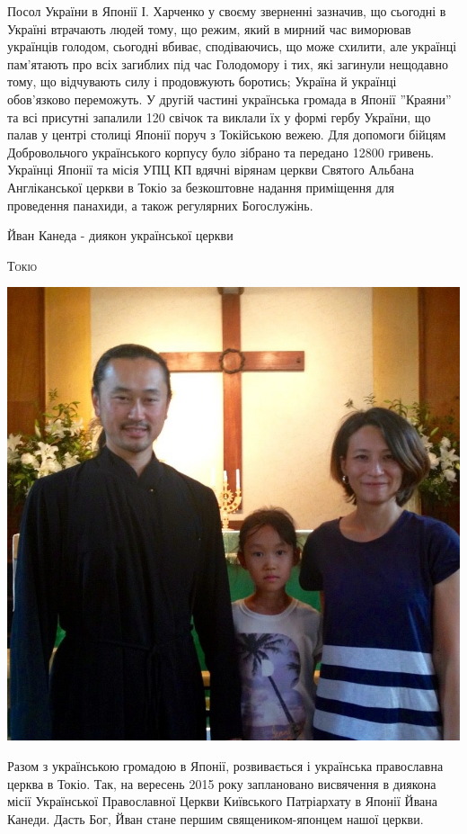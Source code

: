 \documentclass[10pt,a4paper]{article}
\newcommand{\NewsItem}[1]{%
		\usefont{T2A}{iwona}{m}{n} 
		\large #1 \vspace{4pt}
		\par \normalsize \normalfont}
\newcommand{\NewsAuthor}[1]{%
			\hfill \textsc{#1} \vspace{4pt}
			\par \normalfont}
\begin{document}
\begin{multicols}{3}
Посол України в Японії І. Харченко у своєму зверненні зазначив, що сьогодні в Україні втрачають людей тому, що режим, який в мирний час виморював українців голодом, сьогодні вбиває, сподіваючись, що може схилити, але українці пам'ятають про всіх загиблих під час Голодомору і тих, які загинули нещодавно тому, що відчувають силу і продовжують боротись; Україна й українці обов'язково переможуть.
У другій частині українська громада в Японії ''Краяни'' та всі присутні запалили 120 свічок та виклали їх у формі гербу України, що палав у центрі столиці Японії поруч з Токійською вежею.
Для допомоги бійцям Добровольчого українського корпусу було зібрано та передано 12800 гривень.
Українці Японії та місія УПЦ КП вдячні вірянам церкви Святого Альбана Англіканської церкви в Токіо за безкоштовне надання приміщення для проведення панахиди, а також регулярних Богослужінь.

\vspace{1cm}
\NewsItem{Йван Канеда - диякон української церкви}
\NewsAuthor{Токіо}
		\begin{center}
			\includegraphics[width=0.8\linewidth]{images/kaneda}
		\end{center}
Разом з українською громадою в Японії, розвивається і українська православна церква в Токіо. Так, на вересень 2015 року заплановано висвячення в диякона місії Української Православної Церкви Київського Патріархату в Японії Йвана Канеди. Дасть Бог, Йван стане першим священиком-японцем нашої церкви.


\end{multicols}
\end{document}
